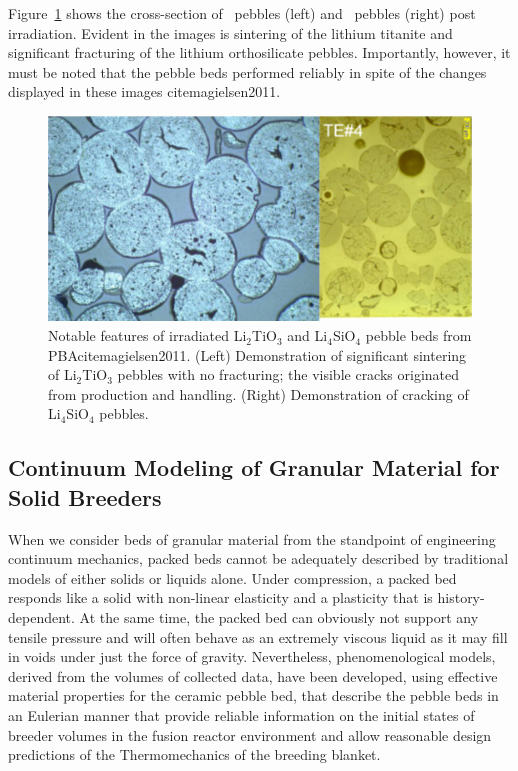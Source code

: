 Figure~\ref{fig:pba} shows the cross-section of \lit~pebbles (left) and \lis~pebbles (right) post irradiation. Evident in the images is sintering of the lithium titanite and significant fracturing of the lithium orthosilicate pebbles. Importantly, however, it must be noted that the pebble beds performed reliably in spite of the changes displayed in these images cite{magielsen2011}. 


\begin{figure}[t!]
\centering
\includegraphics[width=\singleimagewidth]{figures/Fig-10}
\caption{Notable features of irradiated Li$_2$TiO$_3$ and Li$_4$SiO$_4$ pebble beds from PBAcite{magielsen2011}. (Left) Demonstration of significant sintering of Li$_2$TiO$_3$ pebbles with no fracturing; the visible cracks originated from production and handling. (Right) Demonstration of cracking of Li$_4$SiO$_4$ pebbles.}
\label{fig:pba}
\end{figure}



\subsection{Continuum Modeling of Granular Material for Solid Breeders}
When we consider beds of granular material from the standpoint of engineering continuum mechanics, packed beds cannot be adequately described by traditional models of either solids or liquids alone. Under compression, a packed bed responds like a solid with non-linear elasticity and a plasticity that is history-dependent. At the same time, the packed bed can obviously not support any tensile pressure and will often behave as an extremely viscous liquid as it may fill in voids under just the force of gravity. Nevertheless, phenomenological models, derived from the volumes of collected data, have been developed, using effective material properties for the ceramic pebble bed, that describe the pebble beds in an Eulerian manner that provide reliable information on the initial states of breeder volumes in the fusion reactor environment and allow reasonable design predictions of the Thermomechanics of the breeding blanket. 

